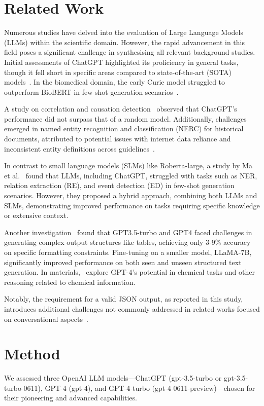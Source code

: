 \documentclass[a4paper]{article}
\begin{document}
\section{Related Work}

Numerous studies have delved into the evaluation of Large Language Models (LLMs) within the scientific domain. However, the rapid advancement in this field poses a significant challenge in synthesising all relevant background studies. Initial assessments of ChatGPT highlighted its proficiency in general tasks, though it fell short in specific areas compared to state-of-the-art (SOTA) models~\cite{kokon2023chatgpt}. In the biomedical domain, the early Curie model struggled to outperform BioBERT in few-shot generation scenarios~\cite{moradi2022gpt3}.

A study on correlation and causation detection~\cite{jin2023large} observed that ChatGPT's performance did not surpass that of a random model. Additionally, challenges emerged in named entity recognition and classification (NERC) for historical documents, attributed to potential issues with internet data reliance and inconsistent entity definitions across guidelines~\cite{gonzalez2023yes}.

In contrast to small language models (SLMs) like Roberta-large, a study by Ma et al.~\cite{ma2023large} found that LLMs, including ChatGPT, struggled with tasks such as NER, relation extraction (RE), and event detection (ED) in few-shot generation scenarios. However, they proposed a hybrid approach, combining both LLMs and SLMs, demonstrating improved performance on tasks requiring specific knowledge or extensive context.

Another investigation~\cite{tang2023struc} found that GPT3.5-turbo and GPT4 faced challenges in generating complex output structures like tables, achieving only 3-9\% accuracy on specific formatting constraints. Fine-tuning on a smaller model, LLaMA-7B, significantly improved performance on both seen and unseen structured text generation.
In materials,~\cite{hatakeyama2023prompt} explore GPT-4’s potential in chemical tasks and other reasoning related to chemical information.

Notably, the requirement for a valid JSON output, as reported in this study, introduces additional challenges not commonly addressed in related works focused on conversational aspects~\cite{lin2023llmeval, min2023factscore}.

\section{Method}
\label{sec:method}
We assessed three OpenAI LLM models—ChatGPT (gpt-3.5-turbo or gpt-3.5-turbo-0611), GPT-4 (gpt-4), and GPT-4-turbo (gpt-4-0611-preview)—chosen for their pioneering and advanced capabilities.
\end{document}
